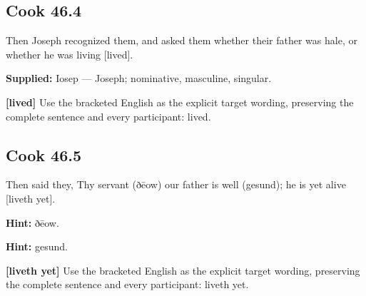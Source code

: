 \par\begin{minipage}{\linewidth}\raggedright
\subsection*{Cook 46.4}

Then Joseph recognized them, and asked them whether their father was hale, or whether he was living [lived].

\textbf{Supplied:} Iosep — Joseph; nominative, masculine, singular.

\textbf{[lived]} Use the bracketed English as the explicit target wording, preserving the complete sentence and every participant: lived.

\end{minipage}\par\addvspace{4pt}

\par\begin{minipage}{\linewidth}\raggedright
\subsection*{Cook 46.5}

Then said they, Thy servant (ðēow) our father is well (gesund); he is yet alive [liveth yet].

\textbf{Hint:} ðēow.

\textbf{Hint:} gesund.

\textbf{[liveth yet]} Use the bracketed English as the explicit target wording, preserving the complete sentence and every participant: liveth yet.

\end{minipage}\par\addvspace{4pt}

